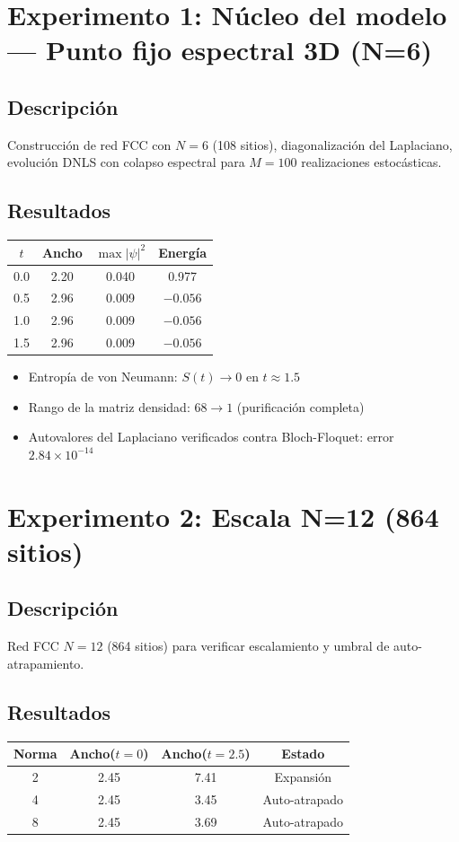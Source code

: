 \documentclass[12pt]{article}
\begin{document}
\section{Experimento 1: N\'ucleo del modelo --- Punto fijo espectral 3D (N=6)}

\subsection{Descripci\'on}
Construcci\'on de red FCC con $N=6$ (108 sitios), diagonalizaci\'on del Laplaciano, evoluci\'on DNLS con colapso espectral para $M=100$ realizaciones estoc\'asticas.

\subsection{Resultados}
\begin{center}
\begin{tabular}{cccc}
\toprule
$t$ & Ancho & $\max|\psi|^2$ & Energ\'ia \\
\midrule
0.0 & 2.20 & 0.040 & 0.977 \\
0.5 & 2.96 & 0.009 & $-0.056$ \\
1.0 & 2.96 & 0.009 & $-0.056$ \\
1.5 & 2.96 & 0.009 & $-0.056$ \\
\bottomrule
\end{tabular}
\end{center}

\begin{itemize}
  \item Entrop\'ia de von Neumann: $S(t)\to 0$ en $t\approx 1.5$
  \item Rango de la matriz densidad: $68 \to 1$ (purificaci\'on completa)
  \item Autovalores del Laplaciano verificados contra Bloch-Floquet: error $2.84\times10^{-14}$
\end{itemize}

\section{Experimento 2: Escala N=12 (864 sitios)}

\subsection{Descripci\'on}
Red FCC $N=12$ (864 sitios) para verificar escalamiento y umbral de auto-atrapamiento.

\subsection{Resultados}
\begin{center}
\begin{tabular}{cccc}
\toprule
Norma & Ancho($t=0$) & Ancho($t=2.5$) & Estado \\
\midrule
2 & 2.45 & 7.41 & Expansi\'on \\
4 & 2.45 & 3.45 & Auto-atrapado \\
8 & 2.45 & 3.69 & Auto-atrapado \\
\bottomrule
\end{tabular}
\end{center}
\end{document}
